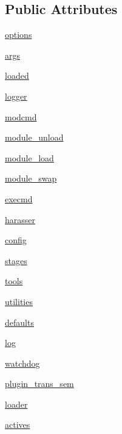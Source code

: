 \subsection*{Public Attributes}
\begin{DoxyCompactItemize}
\item 
\hyperlink{class_test_def_1_1_test_def_a7c7d587995154a9f31607dc4726d3a2a}{options}
\item 
\hyperlink{class_test_def_1_1_test_def_a30e459036991de30822f267f1d882d44}{args}
\item 
\hyperlink{class_test_def_1_1_test_def_a21764cc1b70626946a708b7a0f003b38}{loaded}
\item 
\hyperlink{class_test_def_1_1_test_def_a2ec3a5ec20bb6ba539d68c3c5a40ca5d}{logger}
\item 
\hyperlink{class_test_def_1_1_test_def_af6c1e9ceaf9d8e747bbb57af3bd33198}{modcmd}
\item 
\hyperlink{class_test_def_1_1_test_def_aba7b969431e50773d10f1384ae2149ab}{module\-\_\-unload}
\item 
\hyperlink{class_test_def_1_1_test_def_a6a81a148c0d20e6cdc14ee966b6dc8f2}{module\-\_\-load}
\item 
\hyperlink{class_test_def_1_1_test_def_a7573371e9c4ccc1713439a63a5ccc64f}{module\-\_\-swap}
\item 
\hyperlink{class_test_def_1_1_test_def_aa3ffe5befea4becaad6a8c5f13446039}{execmd}
\item 
\hyperlink{class_test_def_1_1_test_def_a1dc633e4dd69542c5eb07e880d7ea401}{harasser}
\item 
\hyperlink{class_test_def_1_1_test_def_a85a2e1fffeda060f750494dd4082594d}{config}
\item 
\hyperlink{class_test_def_1_1_test_def_a9e15c13bd0cc9b1567c94f847118432e}{stages}
\item 
\hyperlink{class_test_def_1_1_test_def_a2414cc1583555b0c758e0f9f0952a787}{tools}
\item 
\hyperlink{class_test_def_1_1_test_def_a0b9ea6f06c02401ad62e06c4cfd80bd2}{utilities}
\item 
\hyperlink{class_test_def_1_1_test_def_a96d72418702f22844fc2fd5d774c7291}{defaults}
\item 
\hyperlink{class_test_def_1_1_test_def_a50bbc74a64733e7dbec613bbfe3a519d}{log}
\item 
\hyperlink{class_test_def_1_1_test_def_a40da46aa95507cffa798cb152fa69e27}{watchdog}
\item 
\hyperlink{class_test_def_1_1_test_def_ac4a745e8b2151d1eed56e04770562eb9}{plugin\-\_\-trans\-\_\-sem}
\item 
\hyperlink{class_test_def_1_1_test_def_a07a19e8ffafc926b0732d466a837b13b}{loader}
\item 
\hyperlink{class_test_def_1_1_test_def_a1eb766274fa9869e6b04e612e6d169b0}{actives}
\end{DoxyCompactItemize}
